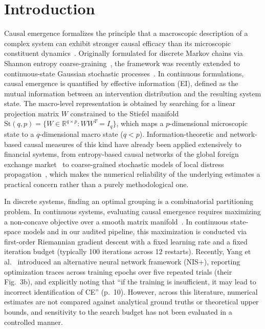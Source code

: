 \documentclass[preprint,12pt]{elsarticle}
\begin{document}
\section{Introduction}

Causal emergence formalizes the principle that a macroscopic description of a complex system can exhibit stronger causal efficacy than its microscopic constituent dynamics~\cite{Hoel2013,Hoel2017}. Originally formulated for discrete Markov chains via Shannon entropy coarse-graining~\cite{Rosas2020,Klein2020}, the framework was recently extended to continuous-state Gaussian stochastic processes~\cite{Liu2024,Liu2025,Yang2025}. In continuous formulations, causal emergence is quantified by effective information (EI), defined as the mutual information between an intervention distribution and the resulting system state. The macro-level representation is obtained by searching for a linear projection matrix $W$ constrained to the Stiefel manifold $\mathrm{St}(q, p) = \{W \in \mathbb{R}^{q \times p} : W W^T = I_q\}$, which maps a $p$-dimensional microscopic state to a $q$-dimensional macro state ($q < p$). Information-theoretic and network-based causal measures of this kind have already been applied extensively to financial systems, from entropy-based causal networks of the global foreign exchange market~\cite{Cao2017} to coarse-grained stochastic models of local distress propagation~\cite{ArenasGarcia2026}, which makes the numerical reliability of the underlying estimates a practical concern rather than a purely methodological one.

In discrete systems, finding an optimal grouping is a combinatorial partitioning problem. In continuous systems, evaluating causal emergence requires maximizing a non-concave objective over a smooth matrix manifold~\cite{Liu2024}. In continuous state-space models and in our audited pipeline, this maximization is conducted via first-order Riemannian gradient descent with a fixed learning rate and a fixed iteration budget (typically 100 iterations across 12 restarts). Recently, Yang et al.~\cite{Yang2025} introduced an alternative neural network framework (NIS+), reporting optimization traces across training epochs over five repeated trials (their Fig.~3b), and explicitly noting that ``if the training is insufficient, it may lead to incorrect identification of CE'' (p.~10). However, across this literature, numerical estimates are not compared against analytical ground truths or theoretical upper bounds, and sensitivity to the search budget has not been evaluated in a controlled manner.
\end{document}
